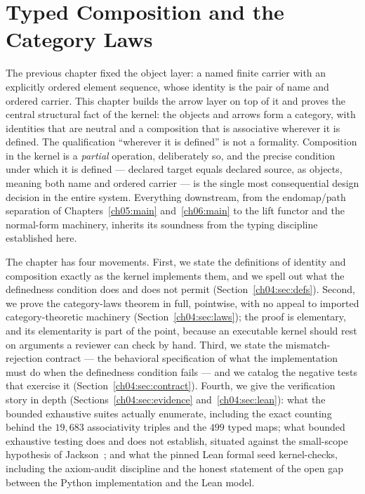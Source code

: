 \chapter{Typed Composition and the Category Laws}
\label{ch04:main}

The previous chapter fixed the object layer: a named finite carrier with an
explicitly ordered element sequence, whose identity is the pair of name and
ordered carrier. This chapter builds the arrow layer on top of it and proves
the central structural fact of the kernel: the objects and arrows form a
category, with identities that are neutral and a composition that is
associative wherever it is defined. The qualification ``wherever it is
defined'' is not a formality. Composition in the kernel is a \emph{partial}
operation, deliberately so, and the precise condition under which it is
defined --- declared target equals declared source, as objects, meaning both
name and ordered carrier --- is the single most consequential design decision
in the entire system. Everything downstream, from the endomap/path separation
of Chapters~\ref{ch05:main} and~\ref{ch06:main} to the lift functor and the
normal-form machinery, inherits its soundness from the typing discipline
established here.

The chapter has four movements. First, we state the definitions of identity
and composition exactly as the kernel implements them, and we spell out what
the definedness condition does and does not permit
(Section~\ref{ch04:sec:defs}). Second, we prove the category-laws theorem in
full, pointwise, with no appeal to imported category-theoretic machinery
(Section~\ref{ch04:sec:laws}); the proof is elementary, and its elementarity
is part of the point, because an executable kernel should rest on arguments a
reviewer can check by hand. Third, we state the mismatch-rejection contract
--- the behavioral specification of what the implementation must do when the
definedness condition fails --- and we catalog the negative tests that
exercise it (Section~\ref{ch04:sec:contract}). Fourth, we give the
verification story in depth (Sections~\ref{ch04:sec:evidence}
and~\ref{ch04:sec:lean}): what the bounded exhaustive suites actually
enumerate, including the exact counting behind the $19{,}683$ associativity
triples and the $499$ typed maps; what bounded exhaustive testing does and
does not establish, situated against the small-scope hypothesis of
Jackson~\cite{jackson}; and what the pinned Lean formal seed kernel-checks,
including the axiom-audit discipline and the honest statement of the open
gap between the Python implementation and the Lean model.

